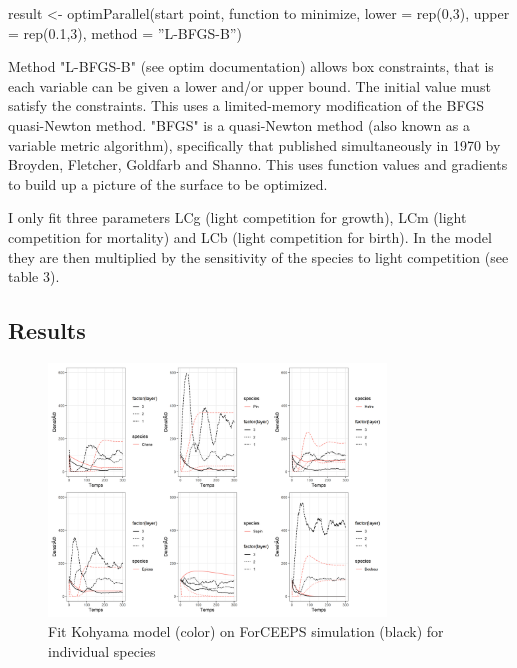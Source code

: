 \documentclass{article}
\begin{document}
\begin{tcolorbox}
result <- optimParallel(start point, function to minimize, lower = rep(0,3), upper = rep(0.1,3), method = ''L-BFGS-B'')
\end{tcolorbox}

Method "L-BFGS-B" (see optim documentation) allows box constraints, that is each variable can be given a lower and/or upper bound. The initial value must satisfy the constraints. This uses a limited-memory modification of the BFGS quasi-Newton method.  "BFGS" is a quasi-Newton method (also known as a variable metric algorithm), specifically that published simultaneously in 1970 by Broyden, Fletcher, Goldfarb and Shanno. This uses function values and gradients to build up a picture of the surface to be optimized.

I only fit three parameters LCg (light competition for growth), LCm (light competition for mortality) and LCb (light competition for birth). In the model they are then multiplied by the sensitivity of the species to light competition (see table 3).

\subsection{Results}

\begin{figure}[H]
    \centering
    \includegraphics[width=0.8\textwidth]{Figure/plot_fit_unique.png}
    \caption{Fit Kohyama model (color) on ForCEEPS simulation (black) for individual species}
    \label{fig:my_label}
\end{figure}
\end{document}
